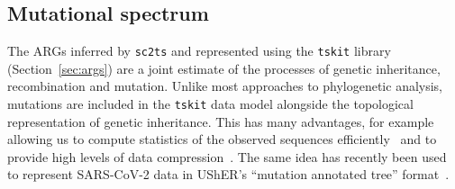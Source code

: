 \documentclass{article}
\begin{document}
\subsection{Mutational spectrum}
\label{sec:mutation_spectrum}
The ARGs inferred by \texttt{sc2ts} and represented using the \texttt{tskit}
library (Section~\ref{sec:args}) are a joint estimate of the processes
of genetic inheritance, recombination and mutation. Unlike most approaches to
phylogenetic analysis, mutations are included in the \texttt{tskit}
data model alongside
the topological representation of genetic inheritance.
This has many
advantages, for example allowing us to compute statistics of the observed
sequences efficiently~\citep{Kelleher2016-wk,Ralph2020-efficiently} and
to provide high levels of data compression~\citep{Kelleher2019-ba}.
The same idea has recently been used to represent
SARS-CoV-2 data in UShER's ``mutation annotated tree''
format~\citep{Turakhia2021-ur}.
\end{document}
